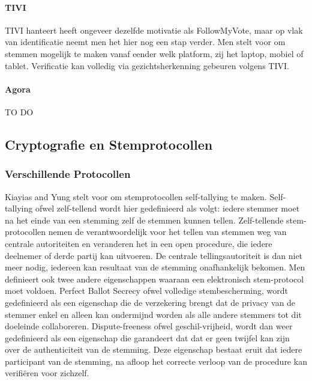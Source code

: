 				\paragraph{TIVI}
					TIVI hanteert heeft ongeveer dezelfde motivatie als FollowMyVote, maar op vlak van identificatie neemt men het hier nog een stap verder. Men stelt voor om stemmen mogelijk te maken vanaf eender welk platform, zij het laptop, mobiel of tablet. Verificatie kan volledig via gezichtsherkenning gebeuren volgens TIVI.
				\paragraph{Agora}
					TO DO
	\newpage
	\subsection{Cryptografie en Stemprotocollen}
		\subsubsection{Verschillende Protocollen}
		Kiayias and Yung stelt voor om stemprotocollen self-tallying te maken. Self-tallying ofwel zelf-tellend wordt hier gedefinieerd als volgt: iedere stemmer moet na het einde van een stemming zelf de stemmen kunnen tellen. Zelf-tellende stem-protocollen nemen de verantwoordelijk voor het tellen van stemmen weg van centrale autoriteiten en veranderen het in een open procedure, die iedere deelnemer of derde partij kan uitvoeren. De centrale tellingsautoriteit is dan niet meer nodig, iedereen kan resultaat van de stemming onafhankelijk bekomen. Men definieert ook twee andere eigenschappen waaraan een elektronisch stem-protocol moet voldoen.  Perfect Ballot Secrecy ofwel volledige stembescherming, wordt gedefinieerd als een eigenschap die de verzekering brengt dat de privacy van de stemmer enkel en alleen kan ondermijnd worden als alle andere stemmers tot dit doeleinde collaboreren. Dispute-freeness ofwel geschil-vrijheid, wordt dan weer gedefinieerd als een eigenschap die garandeert dat dat er geen twijfel kan zijn over de authenticiteit van de stemming. Deze eigenschap bestaat eruit dat iedere participant van de stemming, na afloop het correcte verloop van de procedure kan verifiëren voor zichzelf.
			
